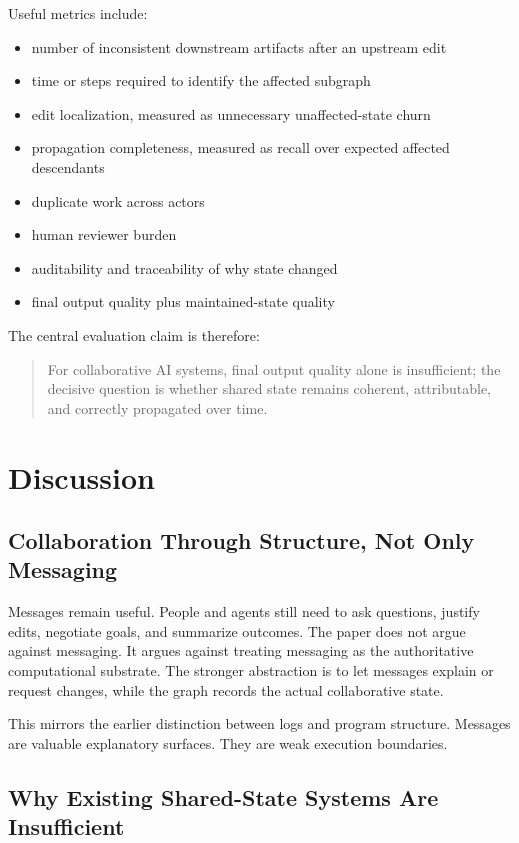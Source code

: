 \documentclass{article}
\begin{document}
Useful metrics include:
\begin{itemize}
\item number of inconsistent downstream artifacts after an upstream edit
\item time or steps required to identify the affected subgraph
\item edit localization, measured as unnecessary unaffected-state churn
\item propagation completeness, measured as recall over expected affected descendants
\item duplicate work across actors
\item human reviewer burden
\item auditability and traceability of why state changed
\item final output quality plus maintained-state quality
\end{itemize}

The central evaluation claim is therefore:
\begin{quote}
For collaborative AI systems, final output quality alone is insufficient; the decisive question is whether shared state remains coherent, attributable, and correctly propagated over time.
\end{quote}

\section{Discussion}

\subsection{Collaboration Through Structure, Not Only Messaging}

Messages remain useful. People and agents still need to ask questions, justify edits, negotiate goals, and summarize outcomes. The paper does not argue against messaging. It argues against treating messaging as the authoritative computational substrate. The stronger abstraction is to let messages explain or request changes, while the graph records the actual collaborative state.

This mirrors the earlier distinction between logs and program structure. Messages are valuable explanatory surfaces. They are weak execution boundaries.

\subsection{Why Existing Shared-State Systems Are Insufficient}
\end{document}
